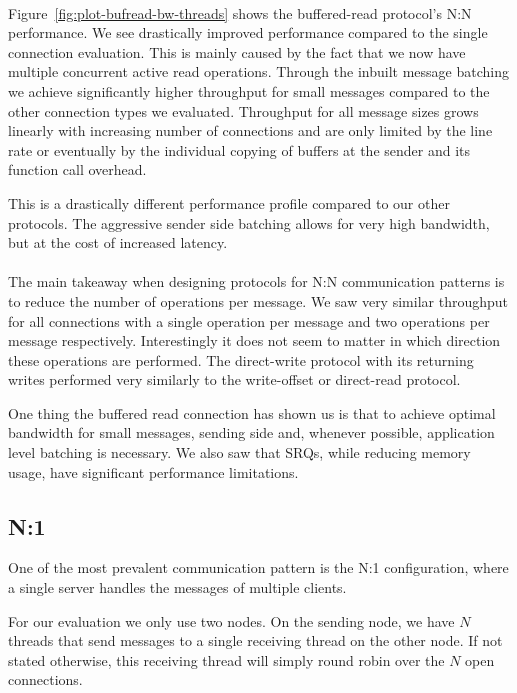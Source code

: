 \paragraph{} Figure~\ref{fig:plot-bufread-bw-threads} shows the buffered-read protocol's N:N performance. We see drastically 
improved performance compared to the single connection evaluation. This is mainly caused by the fact that we now have multiple
concurrent active read operations. Through the inbuilt message batching we achieve  significantly higher throughput for small
messages compared to the other connection types we evaluated. Throughput for all message sizes grows linearly with increasing 
number of connections and are only limited by the line rate or eventually by the individual copying of buffers at the sender 
and its function call overhead.

This is a drastically different performance profile compared to our other protocols. 
The aggressive sender side batching allows
for very high bandwidth, but at the cost of increased latency.


\paragraph{} The main takeaway when designing protocols for N:N communication patterns is to reduce the number of operations
per message. We saw very similar throughput for all connections with a single operation per message and two operations per
message respectively. Interestingly it does not seem to matter in which direction these operations are performed. The 
direct-write protocol with its returning writes performed very similarly to the write-offset or direct-read protocol.

One thing the buffered read connection has shown us is that to achieve optimal bandwidth for small messages, sending side and,
whenever possible, application level batching is necessary.  We also saw that SRQs, while reducing memory usage, have 
significant performance limitations.



\pagebreak
\subsection{N:1}
One of the most prevalent communication pattern is the N:1 configuration, where a single server handles the messages
of multiple clients. 

For our evaluation we only use two nodes. On the sending node, we have $N$ threads that send messages to a
single receiving thread on the other node. If not stated otherwise, this receiving thread will simply 
round robin over the $N$ open connections. 

